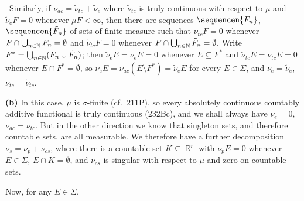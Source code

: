 {{\qquad\grheadb\  Similarly, if $\nu_{ac}=\tilde\nu_{tc}+\tilde\nu_e$
where $\tilde\nu_{tc}$ is truly continuous with respect to $\mu$ and
$\tilde\nu_eF=0$ whenever $\mu F<\infty$, then there are sequences
$\sequencen{F_n}$, $\sequencen{\tilde F_n}$ of sets of finite measure
such that $\nu_{tc}F=0$ whenever
$F\cap\bigcup_{n\in\Bbb N}F_n=\emptyset$ and
$\tilde\nu_{tc}F=0$ whenever
$F\cap\bigcup_{n\in\Bbb N}\tilde F_n=\emptyset$.   Write
$F^*=\bigcup_{n\in\Bbb N}(F_n\cup\tilde F_n)$;
then $\tilde\nu_eE=\nu_eE=0$ whenever $E\subseteq F^*$ and
$\tilde\nu_{tc}E=\nu_{tc}E=0$ whenever $E\cap F^*=\emptyset$, so
$\nu_eE=\nu_{ac}(E\setminus F^*)=\tilde\nu_eE$ for every $E\in\Sigma$,
and $\nu_e=\tilde\nu_e$, $\nu_{tc}=\tilde\nu_{tc}$.\ \Qed}

\medskip

{\bf (b)} In this case, $\mu$ is $\sigma$-finite (cf.\ 211P), so every
absolutely continuous countably additive functional is truly continuous
(232Bc), and we
shall always have $\nu_e=0$, $\nu_{ac}=\nu_{tc}$.   But in the other
direction we know that singleton sets, and therefore countable sets, are
all measurable.   We therefore have a
further decomposition $\nu_s=\nu_p+\nu_{cs}$, where there is a countable
set $K\subseteq\BbbR^r$ with $\nu_pE=0$ whenever $E\in\Sigma$,
$E\cap K=\emptyset$, and $\nu_{cs}$ is singular with respect to $\mu$
and zero on countable sets.   

Now, for any $E\in\Sigma$,


}%

\medskip

